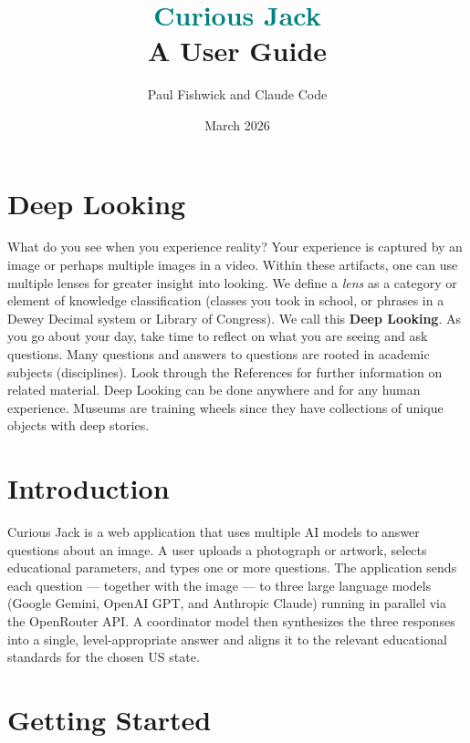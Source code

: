 \documentclass[11pt]{article}
\title{\textcolor{teal}{\Huge Curious Jack}\\[6pt]
\large A User Guide}
\author{Paul Fishwick and Claude Code}
\date{March 2026}
\begin{document}
\maketitle

\tableofcontents
\newpage

\section{Deep Looking}

What do you see when you experience reality? Your experience is captured
by an image or perhaps multiple images in a video. Within these artifacts,
one can use multiple lenses for greater insight into looking. We define a
\emph{lens} as a category or element of knowledge classification (classes
you took in school, or phrases in a Dewey Decimal system or Library of
Congress). We call this \textbf{Deep Looking}. As you go about your day,
take time to reflect on what you are seeing and ask questions. Many
questions and answers to questions are rooted in academic subjects
(disciplines). Look through the References for further information on
related material. Deep Looking can be done anywhere and for any human
experience. Museums are training wheels since they have collections of
unique objects with deep stories.

\section{Introduction}

Curious Jack is a web application that uses multiple AI models to answer
questions about an image. A user uploads a photograph or artwork, selects
educational parameters, and types one or more questions. The application
sends each question --- together with the image --- to three large language
models (Google Gemini, OpenAI GPT, and Anthropic Claude) running in
parallel via the OpenRouter API. A coordinator model then synthesizes the
three responses into a single, level-appropriate answer and aligns it to
the relevant educational standards for the chosen US state.

\section{Getting Started}
\end{document}
